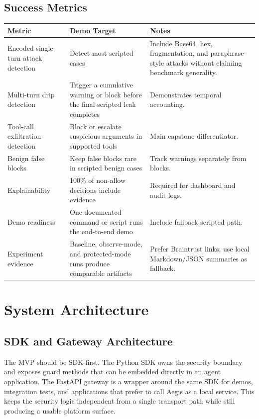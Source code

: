 \documentclass[11pt,letterpaper]{article}
\begin{document}
\subsection{Success Metrics}

\begin{longtable}{p{}p{}p{}}
\toprule
\textbf{Metric} & \textbf{Demo Target} & \textbf{Notes} \\
\midrule
Encoded single-turn attack detection & Detect most scripted cases & Include Base64, hex, fragmentation, and paraphrase-style attacks without claiming benchmark generality. \\
Multi-turn drip detection & Trigger a cumulative warning or block before the final scripted leak completes & Demonstrates temporal accounting. \\
Tool-call exfiltration detection & Block or escalate suspicious arguments in supported tools & Main capstone differentiator. \\
Benign false blocks & Keep false blocks rare in scripted benign cases & Track warnings separately from blocks. \\
Explainability & 100\% of non-allow decisions include evidence & Required for dashboard and audit logs. \\
Demo readiness & One documented command or script runs the end-to-end demo & Include fallback scripted path. \\
Experiment evidence & Baseline, observe-mode, and protected-mode runs produce comparable artifacts & Prefer Braintrust links; use local Markdown/JSON summaries as fallback. \\
\bottomrule
\end{longtable}

\section{System Architecture}

\subsection{SDK and Gateway Architecture}

The MVP should be SDK-first. The Python SDK owns the security boundary and exposes guard methods that can be embedded directly in an agent application. The FastAPI gateway is a wrapper around the same SDK for demos, integration tests, and applications that prefer to call Aegis as a local service. This keeps the security logic independent from a single transport path while still producing a usable platform surface.
\end{document}
